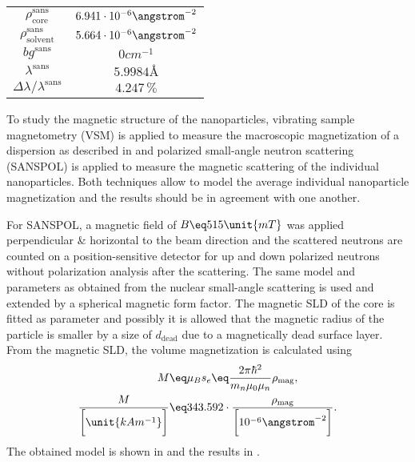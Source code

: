 \documentclass[\main/dresen_thesis.tex]{subfiles}
\begin{document}
\begin{table}[tb]
\begin{tabular}{ c | l | l }
        $\rho_\mathrm{core}^\mathrm{sans}$
          & \multicolumn{2}{c}{$6.941 \cdot 10^{-6} \angstrom^{-2}$}\\
        $\rho_\mathrm{solvent}^\mathrm{sans}$
          & \multicolumn{2}{c}{$5.664 \cdot 10^{-6} \angstrom^{-2}$}\\
        $bg^\mathrm{sans}$
          & \multicolumn{2}{c}{$0 \unit{cm}^{-1}$}\\
          $\lambda^\mathrm{sans}$
            & \multicolumn{2}{c}{$5.9984 \unit{\angstrom}$}\\
          $\Delta \lambda / \lambda ^\mathrm{sans}$
            & \multicolumn{2}{c}{$4.247 \, \%$}\\
        \hline
      \end{tabular}
    \end{table}

    To study the magnetic structure of the nanoparticles, vibrating sample magnetometry (VSM) is applied to measure the macroscopic magnetization of a dispersion as described in  and polarized small-angle neutron scattering (SANSPOL) is applied to measure the magnetic scattering of the individual nanoparticles.
    Both techniques allow to model the average individual nanoparticle magnetization and the results should be in agreement with one another.

    For SANSPOL, a magnetic field of $B\eq 515 \unit{mT}$ was applied perpendicular \& horizontal to the beam direction and the scattered neutrons are counted on a position-sensitive detector for up and down polarized neutrons without polarization analysis after the scattering.
    The same model and parameters as obtained from the nuclear small-angle scattering is used and extended by a spherical magnetic form factor.
    The magnetic SLD of the core is fitted as parameter and possibly it is allowed that the magnetic radius of the particle is smaller by a size of $d_\mathrm{dead}$ due to a magnetically dead surface layer.
    From the magnetic SLD, the volume magnetization is calculated using 
    \begin{align}
      M \eq& \mu_B s_e \eq \frac{2 \pi \hbar^2}{m_n \mu_0 \mu_n} \rho_\mathrm{mag},\\
      \frac{M}{\bigg[\unit{kA m^{-1}}\bigg]} \eq& 343.592 \cdot \frac{\rho_\mathrm{mag}}{\bigg[10^{-6} \angstrom^{-2} \bigg]}.
    \end{align}
    The obtained model is shown in  and the results in .
\end{document}
